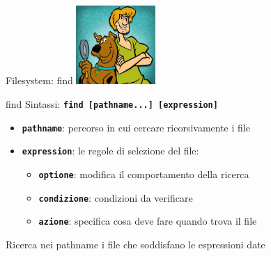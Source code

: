 \documentclass{beamer}
\begin{document}
    \begin{frame}{Filesystem: find}
        \centering
        \includegraphics[height=3cm, keepaspectratio]{images/scooby.jpg}

        \begin{block}{find}
            \small
            Sintassi: \texttt{\textbf{find [pathname...] [expression]}}

            \begin{itemize}
                \item \texttt{\textbf{pathname}}: percorso in cui cercare ricorsivamente i file
                \item \texttt{\textbf{expression}}: le regole di selezione del file:
                \begin{itemize}
                    \item \texttt{\textbf{optione}}: modifica il comportamento della ricerca
                    \item \texttt{\textbf{condizione}}: condizioni da verificare
                    \item \texttt{\textbf{azione}}: specifica cosa deve fare quando trova il file
                \end{itemize}
            \end{itemize}

            Ricerca nei pathname i file che soddisfano le espressioni date
        \end{block}
    \end{frame}
\end{document}
